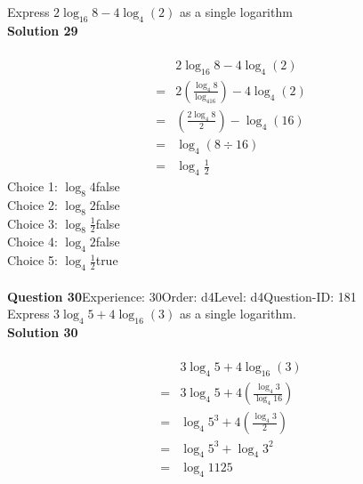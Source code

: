\documentclass{article}
\begin{document}
Express $2\log_{16}8-4\log_{4}(2)$ as a single logarithm\\[4pt]
\noindent\textbf{Solution 29}\\[2pt]
\\[-35pt]\begin{align*}
&2\log_{16}8-4\log_{4}(2)\\[2pt]
=&2\left(\displaystyle\frac{\log_{4}8}{\log_416}\right)-4\log_{4}(2)\\[2pt]
=&\left(\displaystyle\frac{2\log_{4}8}{2}\right)-\log_{4}(16)\\[2pt]
=&\log_{4}(8 \div 16)\\[2pt]
=&\log_{4}\displaystyle\frac{1}{2}
\end{align*}
Choice 1: \hspace{20pt}$\log_{8}4$\hspace{20pt}false\\
Choice 2: \hspace{20pt}$\log_{8}2$\hspace{20pt}false\\
Choice 3: \hspace{20pt}$\log_{8}\displaystyle\frac{1}{2}$\hspace{20pt}false\\
Choice 4: \hspace{20pt}$\log_{4}2$\hspace{20pt}false\\
Choice 5: \hspace{20pt}$\log_{4}\displaystyle\frac{1}{2}$\hspace{20pt}true\\
\\[4pt]
\noindent\textbf{Question 30}\hspace{20pt}Experience: 30\hspace{20pt}Order: d4\hspace{20pt}Level: d4\hspace{20pt}Question-ID: 181\\[2pt]
Express $3\log_{4}5+4\log_{16}(3)$ as a single logarithm.\\[4pt]
\noindent\textbf{Solution 30}\\[2pt]
\\[-35pt]\begin{align*}
&3\log_{4}5+4\log_{16}(3)\\[2pt]
=&3\log_{4}5+4\left(\displaystyle\frac{\log_{4}3}{\log_{4}16}\right)\\[2pt]
=&\log_{4}5^3+4\left(\displaystyle\frac{\log_{4}3}{2}\right)\\[2pt]
=&\log_{4}5^3+\log_{4}3^2\\[2pt]
=&\log_{4}1125\\[-120pt]
\end{align*}
\end{document}
